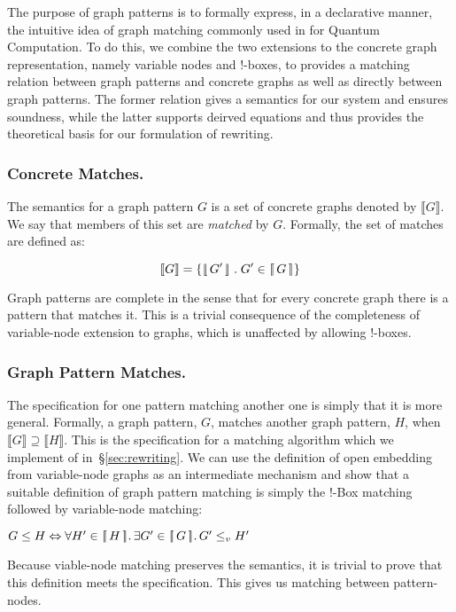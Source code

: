 \documentclass[runningheads]{llncs}
\newcommand{\vinterp}[1]{\lfloor\hspace{-0.27em}|\, #1\, |\hspace{-0.27em}\rfloor}
\newcommand{\binterp}[1]{\lceil\hspace{-0.27em}|\, #1\, |\hspace{-0.27em}\rceil}
\newcommand{\minterp}[1]{\llbracket #1 \rrbracket}
\begin{document}
The purpose of graph patterns is to formally express, in a declarative
manner, the intuitive idea of graph matching commonly used in for
Quantum Computation. To do this, we combine the two extensions to the
concrete graph representation, namely variable nodes and !-boxes, to
provides a matching relation between graph patterns and concrete
graphs as well as directly between graph patterns. The former relation
gives a semantics for our system and ensures soundness, while the
latter supports deirved equations and thus provides the theoretical
basis for our formulation of rewriting.

\subsubsection{Concrete Matches.}

The semantics for a graph pattern $G$ is a set of concrete graphs
denoted by $\minterp{G}$. We say that members of this set are
\emph{matched} by $G$. Formally, the set of matches are defined as:

$$\minterp{G} = \{\vinterp{G'}\;.\; G' \in \binterp{G}\}$$

Graph patterns are complete in the sense that for every concrete graph
there is a pattern that matches it. This is a trivial consequence of
the completeness of variable-node extension to graphs, which is
unaffected by allowing !-boxes.

\subsubsection{Graph Pattern Matches.}

The specification for one pattern matching another one is simply that
it is more general. Formally, a graph pattern, $G$, matches another
graph pattern, $H$, when $\minterp{G} \supseteq \minterp{H}$. This is
the specification for a matching algorithm which we implement of
in~\S\ref{sec:rewriting}. We can use the definition of open embedding
from variable-node graphs as an intermediate mechanism and show that a
suitable definition of graph pattern matching is simply the !-Box
matching followed by variable-node matching:

\begin{definition}
  $G \leq H \Leftrightarrow \forall H' \in \binterp{H}.\,\exists G' \in \binterp{G}.\, G' \leq_v H'$
\end{definition}

Because viable-node matching preserves the semantics, it is trivial to
prove that this definition meets the specification. This gives us
matching between pattern-nodes.
\end{document}
